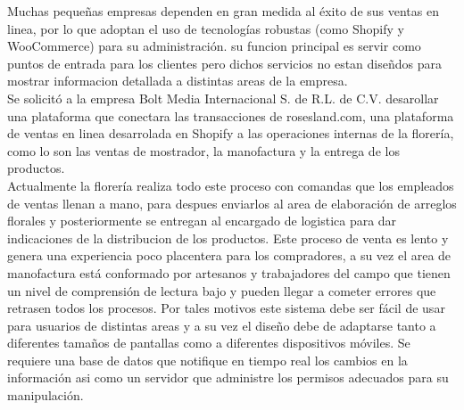 Muchas pequeñas empresas dependen en gran medida al éxito de sus ventas en linea,
por lo que adoptan el uso de tecnologías robustas (como Shopify y WooCommerce) para su administración.
su funcion principal es servir como puntos de entrada para los clientes pero
dichos servicios no estan diseñdos para mostrar informacion detallada a distintas areas de la empresa. \\[0.3cm]
Se solicitó a la empresa Bolt Media Internacional S. de R.L. de C.V.
desarollar una plataforma que conectara las transacciones de rosesland.com,
una plataforma de ventas en linea desarrolada en Shopify a las operaciones internas de la florería,
como lo son las ventas de mostrador, la manofactura y la entrega de los productos. \\[0.3cm]
Actualmente la florería realiza todo este proceso con comandas que los empleados de ventas llenan a mano, para despues
enviarlos al area de elaboración de arreglos florales y posteriormente se entregan al encargado de logistica para
dar indicaciones de la distribucion de los productos. Este proceso de venta es lento y genera una experiencia poco placentera
para los compradores, a su vez el area de manofactura está conformado por artesanos y trabajadores del campo que
tienen un nivel de comprensión de lectura bajo y pueden llegar a cometer errores que retrasen todos los procesos.
Por tales motivos este sistema debe ser fácil de usar para usuarios de distintas areas y a su vez 
el diseño debe de adaptarse tanto a diferentes tamaños de pantallas como a diferentes dispositivos móviles.
Se requiere una base de datos que notifique en tiempo real los cambios
en la información asi como un servidor que administre los permisos adecuados para su manipulación.